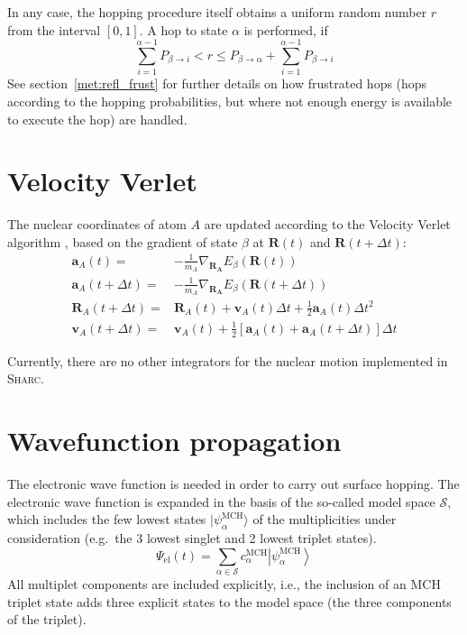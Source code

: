 \documentclass[a4paper,10pt,DIV=15,openany]{scrbook}
\newcommand{\sharc}{\textsc{Sharc}}
\newcommand{\VEC}[1]{\ensuremath{\mathbf{#1}}}
\begin{document}
In any case, the hopping procedure itself obtains a uniform random number $r$ from the interval $[0,1]$. A hop to state $\alpha$ is performed, if
\begin{equation}
  \sum\limits_{i=1}^{\alpha-1} P_{\beta\rightarrow i} < r \le P_{\beta\rightarrow\alpha}+\sum\limits_{i=1}^{\alpha-1} P_{\beta\rightarrow i}
  \label{eq:cumuprob}
\end{equation}
See section~\ref{met:refl_frust} for further details on how frustrated hops (hops according to the hopping probabilities, but where not enough energy is available to execute the hop) are handled.


\section{Velocity Verlet}

The nuclear coordinates of atom $A$ are updated according to the Velocity Verlet algorithm \cite{Verlet1967PR}, based on the gradient of state $\beta$ at $\VEC{R}(t)$ and $\VEC{R}(t+\Delta t)$:
\begin{align}
  \VEC{a}_A(t)=&
  -\frac{1}{m_A}\nabla_{\VEC{R_A}}E_\beta(\VEC{R}(t))\\
  \VEC{a}_A(t+\Delta t)=&
  -\frac{1}{m_A}\nabla_{\VEC{R_A}}E_\beta(\VEC{R}(t+\Delta t))\\
  \VEC{R}_A(t+\Delta t)=&
  \VEC{R}_A(t)+\VEC{v}_A(t)\Delta t + \frac{1}{2}\VEC{a}_A(t)\Delta t^2\\
  \VEC{v}_A(t+\Delta t)=&
  \VEC{v}_A(t)+\frac{1}{2}\left[\VEC{a}_A(t)+\VEC{a}_A(t+\Delta t)\right]\Delta t
\end{align}

Currently, there are no other integrators for the nuclear motion implemented in \sharc.


\section{Wavefunction propagation}\label{met:propagate}

The electronic wave function is needed in order to carry out surface hopping. The electronic wave function is expanded in the basis of the so-called model space $\mathcal{S}$, which includes the few lowest states $|\psi^{\text{MCH}}_\alpha\rangle$ of the multiplicities under consideration (e.g.\ the 3 lowest singlet and 2 lowest triplet states). 
\begin{equation}
  \Psi_{\text{el}}(t)=\sum\limits_{\alpha\in\mathcal{S}} c^{\text{MCH}}_\alpha \left|\psi^{\text{MCH}}_\alpha\right\rangle
\end{equation}
All multiplet components are included explicitly, i.e., the inclusion of an MCH triplet state adds three explicit states to the model space (the three components of the triplet).
\end{document}
